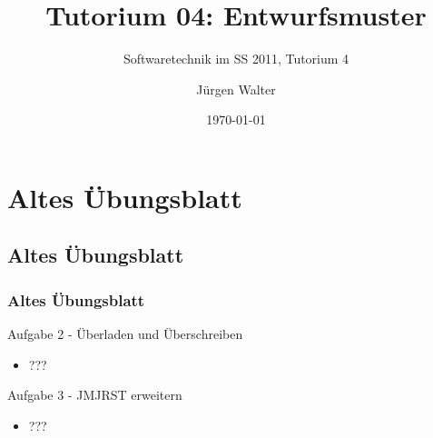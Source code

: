 

\title[Tutorium04]{Tutorium 04: Entwurfsmuster}
\subtitle{Softwaretechnik im SS 2011, Tutorium 4}
\author{Jürgen Walter}
\date{\today}




\begin{frame}
\titlepage
\end{frame}


\section{Altes Übungsblatt}

\subsection{Altes Übungsblatt}


\begin{frame}[fragile]
\frametitle{Altes Übungsblatt}
	\begin{block}{Aufgabe 2 - Überladen und Überschreiben}
	\begin{itemize}
	\item ???
	\end{itemize}
	\end{block}
	\pause
	\begin{block}{Aufgabe 3 - JMJRST erweitern} 
	\begin{itemize}
	\item ???
	\end{itemize}
	\end{block}
\end{frame}


